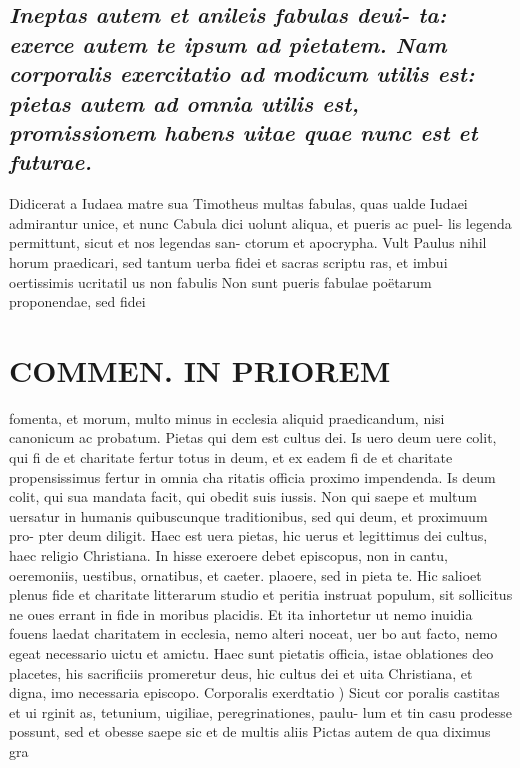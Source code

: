 \documentclass{article}
\begin{document}
\begin{pages}
\subsection*{\textit{Ineptas autem et anileis fabulas deui- ta: exerce autem te ipsum ad pietatem. Nam corporalis exercitatio ad modicum utilis est: pietas autem ad omnia utilis est, promissionem habens uitae quae nunc est et futurae. }}\pstart Didicerat a Iudaea matre sua Timotheus multas fabulas, quas ualde Iudaei admirantur unice, et nunc Cabula dici uolunt aliqua, et pueris ac puel- lis legenda permittunt, sicut et nos legendas san- ctorum et apocrypha. Vult Paulus nihil horum praedicari, sed tantum uerba fidei et sacras scriptu ras, et imbui oertissimis ucritatil us non fabulis Non sunt pueris fabulae poëtarum proponendae, sed fidei  \pend
\section*{COMMEN. IN PRIOREM }
\marginpar{[ p.104 ]}\pstart fomenta, et morum, multo minus in ecclesia aliquid praedicandum, nisi canonicum ac probatum. Pietas qui dem est cultus dei. Is uero deum uere colit, qui fi de et charitate fertur totus in deum, et ex eadem fi de et charitate propensissimus fertur in omnia cha ritatis officia proximo impendenda. Is deum colit, qui sua mandata facit, qui obedit suis iussis. Non qui saepe et multum uersatur in humanis quibuscunque  traditionibus, sed qui deum, et proximuum pro- pter deum diligit. Haec est uera pietas, hic uerus et legittimus dei cultus, haec religio Christiana. In hisse exeroere debet episcopus, non in cantu, oeremoniis, uestibus, ornatibus, et caeter. plaoere, sed in pieta te. Hic salioet plenus fide et charitate litterarum studio et peritia instruat populum, sit sollicitus ne oues errant in fide in moribus placidis. Et ita inhortetur ut nemo inuidia fouens laedat charitatem in ecclesia, nemo alteri noceat, uer bo aut facto, nemo egeat necessario uictu et amictu. Haec sunt pietatis officia, istae oblationes deo placetes, his sacrificiis promeretur deus, hic cultus dei et uita Christiana, et digna, imo necessaria episcopo.  \pend\pstart Corporalis exerdtatio ) Sicut cor poralis castitas et ui rginit as, tetunium, uigiliae, peregrinationes, paulu- lum et tin casu prodesse possunt, sed et obesse saepe sic et de multis aliis Pictas autem de qua diximus gra  \pend

\end{pages}
\end{document}
